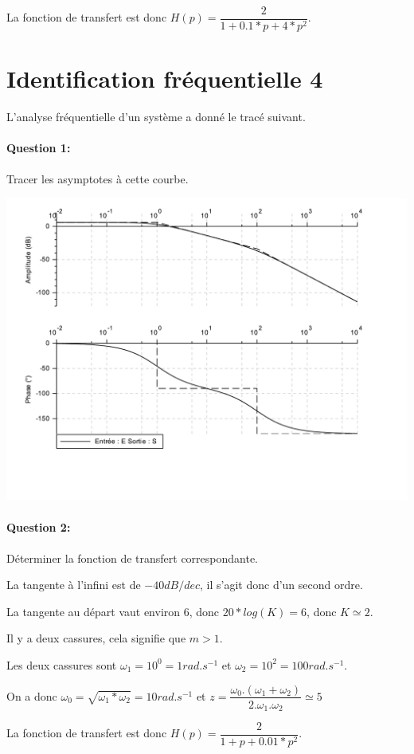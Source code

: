 La fonction de transfert est donc $H(p)=\dfrac{2}{1+0.1*p+4*p^2}$.

\newpage

\section{Identification fréquentielle 4}

L'analyse fréquentielle d'un système a donné le tracé suivant.

\paragraph{Question 1:} Tracer les asymptotes à cette courbe.

\begin{center}
 \includegraphics[width=0.8\linewidth]{img/Bode4_c}
\end{center} 

\paragraph{Question 2:} Déterminer la fonction de transfert correspondante.

La tangente à l'infini est de $-40dB/dec$, il s'agit donc d'un second ordre.

La tangente au départ vaut environ $6$, donc $20*log(K)=6$, donc $K\simeq 2$.

Il y a deux cassures, cela signifie que $m>1$.

Les deux cassures sont $\omega_1=10^0=1 rad.s^{-1}$ et $\omega_2=10^2=100 rad.s^{-1}$.

On a donc $\omega_0=\sqrt{\omega_1*\omega_2}=10rad.s^{-1}$ et $z=\dfrac{\omega_0.(\omega_1+\omega_2)}{2.\omega_1.\omega_2}\simeq 5$

La fonction de transfert est donc $H(p)=\dfrac{2}{1+p+0.01*p^2}$.


